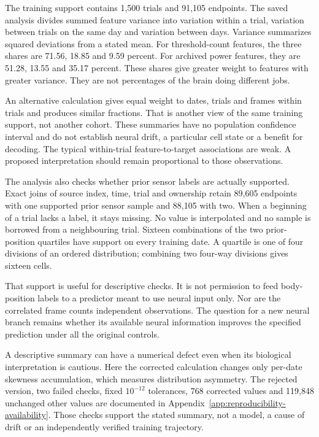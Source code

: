 The training support contains 1,500 trials and 91,105 endpoints. The saved
analysis divides summed feature variance into variation within a trial,
variation between trials on the same day and variation between days. Variance
summarizes squared deviations from a stated mean. For threshold-count features,
the three shares are 71.56, 18.85 and 9.59 percent. For archived power features,
they are 51.28, 13.55 and 35.17 percent. These shares give greater weight to
features with greater variance. They are not percentages of the brain doing
different jobs.

An alternative calculation gives equal weight to dates, trials and frames
within trials and produces similar fractions. That is another view of the
same training support, not another cohort. These summaries have no population
confidence interval and do not establish neural drift, a particular cell state
or a benefit for decoding. The typical within-trial feature-to-target
associations are weak. A proposed interpretation should remain proportional
to those observations.

The analysis also checks whether prior sensor labels are actually supported.
Exact joins of source index, time, trial and ownership retain 89,605 endpoints
with one supported prior sensor sample and 88,105 with two. When a beginning
of a trial lacks a label, it stays missing. No value is interpolated and no
sample is borrowed from a neighbouring trial. Sixteen combinations of the two
prior-position quartiles have support on every training date. A quartile is
one of four divisions of an ordered distribution; combining two four-way
divisions gives sixteen cells.

That support is useful for descriptive checks. It is not permission to feed
body-position labels to a predictor meant to use neural input only. Nor are
the correlated frame counts independent observations. The question for a new
neural branch remains whether its available neural information improves the
specified prediction under all the original controls.

A descriptive summary can have a numerical defect even when its biological interpretation is cautious. Here the corrected calculation changes only per-date skewness accumulation, which measures distribution asymmetry. The rejected version, two failed checks, fixed $10^{-12}$ tolerances, 768 corrected values and 119,848 unchanged other values are documented in Appendix~\ref{app:reproducibility-availability}. Those checks support the stated summary, not a model, a cause of drift or an independently verified training trajectory.

